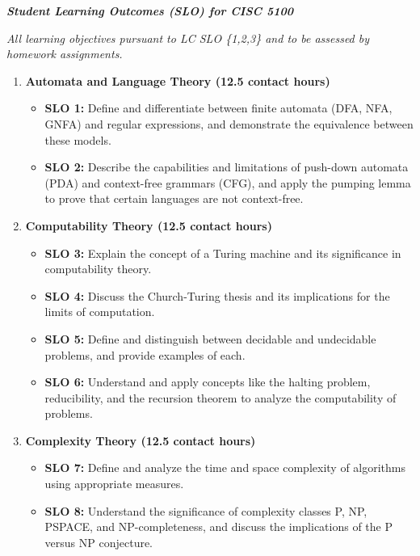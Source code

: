 \documentclass[11pt]{article}
\begin{document}
\textbf{\textit{Student Learning Outcomes (SLO) for CISC 5100}}

\skip

\textit{All learning objectives pursuant to LC SLO \{1,2,3\} and to be assessed by homework assignments.}

\begin{enumerate}
    \item \textbf{Automata and Language Theory (12.5 contact hours)}
        \begin{itemize}
            \item \textbf{SLO 1:} Define and differentiate between finite automata (DFA, NFA, GNFA) and regular expressions, and demonstrate the equivalence between these models.
            \item \textbf{SLO 2:} Describe the capabilities and limitations of push-down automata (PDA) and context-free grammars (CFG), and apply the pumping lemma to prove that certain languages are not context-free.
        \end{itemize}
    \item \textbf{Computability Theory (12.5 contact hours)}
        \begin{itemize}
            \item \textbf{SLO 3:} Explain the concept of a Turing machine and its significance in computability theory.
            \item \textbf{SLO 4:} Discuss the Church-Turing thesis and its implications for the limits of computation.
            \item \textbf{SLO 5:} Define and distinguish between decidable and undecidable problems, and provide examples of each.
            \item \textbf{SLO 6:} Understand and apply concepts like the halting problem, reducibility, and the recursion theorem to analyze the computability of problems.
        \end{itemize}
    \item \textbf{Complexity Theory (12.5 contact hours)}
        \begin{itemize}
            \item \textbf{SLO 7:} Define and analyze the time and space complexity of algorithms using appropriate measures.
            \item \textbf{SLO 8:} Understand the significance of complexity classes P, NP, PSPACE, and NP-completeness, and discuss the implications of the P versus NP conjecture.
        \end{itemize}
\end{enumerate}
\end{document}
